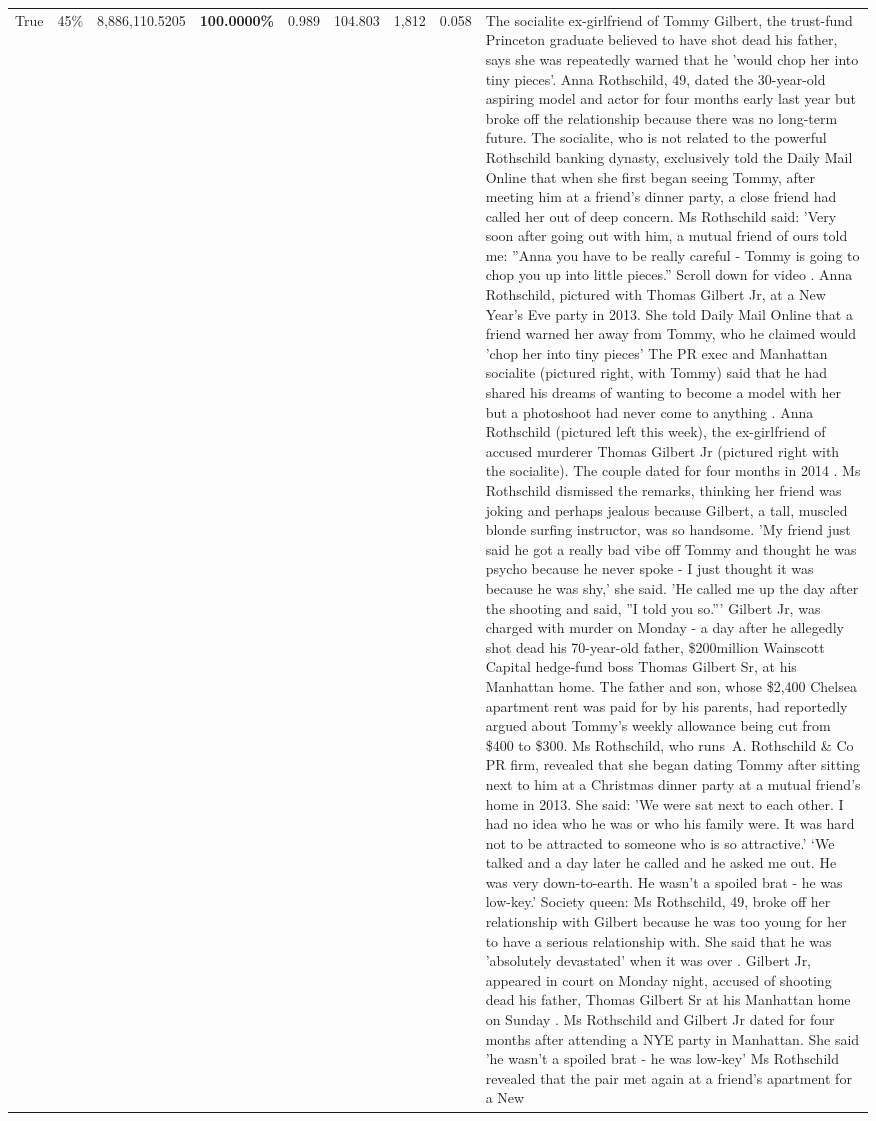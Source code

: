 \begin{table}[H]
\begin{tabular}{lllrlllll}
True & 45\% & 8,886,110.5205 & \bfseries \color{red} 100.0000\% & 0.989 & 104.803 & 1,812 & 0.058 & The socialite ex-girlfriend of Tommy Gilbert, the trust-fund Princeton graduate believed to have shot dead his father, says she was repeatedly warned that he 'would chop her into tiny pieces'. Anna Rothschild, 49, dated the 30-year-old aspiring model and actor for four months early last year but broke off the relationship because there was no long-term future. The socialite, who is not related to the powerful Rothschild banking dynasty, exclusively told the Daily Mail Online that when she first began seeing Tommy, after meeting him at a friend's dinner party, a close friend had called her out of deep concern. Ms Rothschild said: 'Very soon after going out with him, a mutual friend of ours told me: ''Anna you have to be really careful - Tommy is going to chop you up into little pieces.'' Scroll down for video . Anna Rothschild, pictured with Thomas Gilbert Jr, at a New Year's Eve party in 2013. She told Daily Mail Online that a friend warned her away from Tommy, who he claimed would 'chop her into tiny pieces' The PR exec and Manhattan socialite (pictured right, with Tommy) said that he had shared his dreams of wanting to become a model with her but a photoshoot had never come to anything . Anna Rothschild (pictured left this week), the ex-girlfriend of accused murderer Thomas Gilbert Jr (pictured right with the socialite). The couple dated for four months in 2014 . Ms Rothschild dismissed the remarks, thinking her friend was joking and perhaps jealous because Gilbert, a tall, muscled blonde surfing instructor, was so handsome. 'My friend just said he got a really bad vibe off Tommy and thought he was psycho because he never spoke - I just thought it was because he was shy,' she said. 'He called me up the day after the shooting and said, ''I told you so.''' Gilbert Jr, was charged with murder on Monday - a day after he allegedly shot dead his 70-year-old father, \$200million Wainscott Capital hedge-fund boss Thomas Gilbert Sr, at his Manhattan home. The father and son, whose \$2,400 Chelsea apartment rent was paid for by his parents, had reportedly argued about Tommy's weekly allowance being cut from \$400 to \$300. Ms Rothschild, who runs A. Rothschild \& Co PR firm, revealed that she began dating Tommy after sitting next to him at a Christmas dinner party at a mutual friend's home in 2013. She said: 'We were sat next to each other. I had no idea who he was or who his family were. It was hard not to be attracted to someone who is so attractive.' ‘We talked and a day later he called and he asked me out. He was very down-to-earth. He wasn’t a spoiled brat - he was low-key.’ Society queen: Ms Rothschild, 49, broke off her relationship with Gilbert because he was too young for her to have a serious relationship with. She said that he was 'absolutely devastated' when it was over . Gilbert Jr, appeared in court on Monday night, accused of shooting dead his father, Thomas Gilbert Sr at his Manhattan home on Sunday . Ms Rothschild and Gilbert Jr dated for four months after attending a NYE party in Manhattan. She said 'he wasn't a spoiled brat - he was low-key' Ms Rothschild revealed that the pair met again at a friend’s apartment for a New 
\end{tabular}
\end{table}

